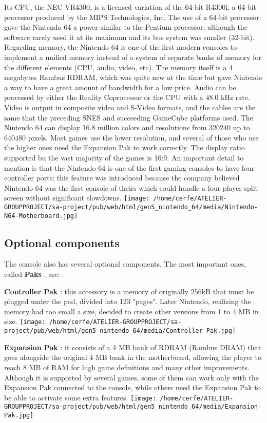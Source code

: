 \documentclass[a4paper,10pt]{book}
\begin{document}
          Its CPU, the NEC VR4300, is a licensed variation of the 64-bit R4300i, a 64-bit processor produced by the MIPS Technologies, Inc. The use of a 64-bit processor gave the Nintendo 64 a power similar to the Pentium processor, although the software rarely used it at its maximum and its bus system was smaller (32-bit). Regarding memory, the Nintendo 64 is one of the first modern consoles to implement a unified memory instead of a system of separate banks of memory for the different elements (CPU, audio, video, etc). 
          The memory itself is a 4 megabytes Rambus RDRAM, which was quite new at the time but gave Nintendo a way to have a great amount of bandwidth for a low price. 
          Audio can be processed by either the Reality Coprocessor or the CPU with a 48.0 kHz rate. Video is output in composite video and S-Video formats, and the cables are the same that the preceding SNES and succeeding GameCube platforms used. 
          The Nintendo 64 can display 16.8 million colors and resolutions from 320240 up to 640480 pixels. Most games use the lower resolution, and several of those who use the higher ones need the Expansion Pak to work correctly. The display ratio supported bu the vast majority of the games is 16:9. 
          An important detail to mention is that the Nintendo 64 is one of the first gaming consoles to have four controller ports: this feature was introduced because the company believed Nintendo 64 was the first console of theirs which could handle a four player split screen without significant slowdowns. 
 \texttt{[image: /home/cerfe/ATELIER-GROUPPROJECT/sa-project/pub/web/html/gen5\_nintendo\_64/media/Nintendo-N64-Motherboard.jpg]}
 
 \subsection{Optional components }
 
          The console also has several optional components. The most important ones, called  \textbf{Paks } , are:
           
 \textbf{Controller Pak } : this accessory is a memory of originally 256kB that must be plugged under the pad, divided into 123 "pages". Later Nintendo, realizing the memory had too small a size, decided to create other versions from 1 to 4 MB in size. 
 \texttt{[image: /home/cerfe/ATELIER-GROUPPROJECT/sa-project/pub/web/html/gen5\_nintendo\_64/media/Controller-Pak.jpg]}
 
 \textbf{Expansion Pak } : it consists of a 4 MB bank of RDRAM (Rambus DRAM) that goes alongside the original 4 MB bank in the motherboard, allowing the player to reach 8 MB of RAM for high game definitions and many other improvements. Although it is supported by several games, some of them can work only with the Expansion Pak connected to the console, while others need the Expansion Pak to be able to activate some extra features. 
 \texttt{[image: /home/cerfe/ATELIER-GROUPPROJECT/sa-project/pub/web/html/gen5\_nintendo\_64/media/Expansion-Pak.jpg]}
 
\end{document}
